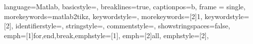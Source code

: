 \usepackage{fancyhdr} %
\pagestyle{fancy} %
\renewcommand{\chaptermark}[1]{\markboth{\thechapter.\ #1}{}}
\fancyhf{} %
\fancyhead[L]{\nouppercase\leftmark} %
\fancyfoot[C]{\thepage} %


\usepackage{listings}
\lstset
{language=Matlab,%
	basicstyle=\footnotesize,
	breaklines=true,%
	captionpos=b,
	frame = single,
	morekeywords={matlab2tikz},
	keywordstyle=\color{blue},%
	morekeywords=[2]{1}, keywordstyle=[2]{\color{black}},
	identifierstyle=\color{black},%
	stringstyle=\color{mylilas},
	commentstyle=\color{mygreen},%
	showstringspaces=false,%
	emph=[1]{for,end,break},emphstyle=[1]\color{red}, %
	emph=[2]{all}, emphstyle=[2]\color{mylilas},    
}


\usepackage{lipsum}












%
%

